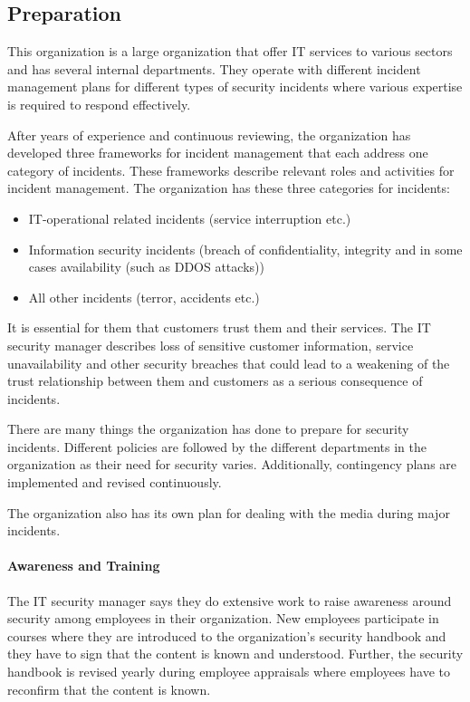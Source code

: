\subsection{Preparation}
This organization is a large organization that offer IT services to various sectors and has several internal departments. They operate with different incident management plans for different types of security incidents where various expertise is required to respond effectively.  

After years of experience and continuous reviewing, the organization has developed three frameworks for incident management that each address one category of incidents. These frameworks describe relevant roles and activities for incident management. The organization has these three categories for incidents:
\begin{itemize}
\item IT-operational related incidents (service interruption etc.)
\item Information security incidents (breach of confidentiality, integrity and in some cases availability (such as DDOS attacks))
\item All other incidents (terror, accidents etc.)
\end{itemize}
 
It is essential for them that customers trust them and their services. The IT security manager describes loss of sensitive customer information, service unavailability and other security breaches that could lead to a weakening of the trust relationship between them and customers as a serious consequence of incidents. 

There are many things the organization has done to prepare for security incidents. Different policies are followed by the different departments in the organization as their need for security varies. Additionally, contingency plans are implemented and revised continuously. 

The organization also has its own plan for dealing with the media during major incidents. 

\paragraph{Awareness and Training}
The IT security manager says they do extensive work to raise awareness around security among employees in their organization. New employees participate in courses where they are introduced to the organization's security handbook and they have to sign that the content is known and understood. Further, the security handbook is revised yearly during employee appraisals where employees have to reconfirm that the content is known.  

